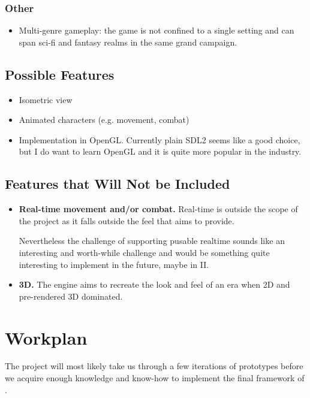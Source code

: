 \documentclass[a4paper,10pt]{book}
\begin{document}
\subsection{Other}
\begin{itemize}
  \item Multi-genre gameplay: the game is not confined to a single setting and
    can span sci-fi and fantasy realms in the same grand campaign.
\end{itemize}

\section{Possible Features}
\begin{itemize}
  \item Isometric view
  \item Animated characters (e.g. movement, combat)
  \item Implementation in OpenGL. Currently plain SDL2 seems like a good
    choice, but I do want to learn OpenGL and it is quite more popular in the
    industry.
\end{itemize}

\section{Features that Will Not be Included}
\begin{itemize}
  \item \textbf{Real-time movement and/or combat.} Real-time is outside the
    scope of the project as it falls outside the feel that \Gamename{} aims to
    provide.
 
  Nevertheless the challenge of supporting pusable realtime sounds like an
    interesting and worth-while challenge and would be something quite
    interesting to implement in the future, maybe in \Enginename{} II.
 
  \item \textbf{3D.} The engine aims to recreate the look and feel of an era
    when 2D and pre-rendered 3D dominated.
\end{itemize}

\chapter{Workplan}
The project will most likely take us through a few iterations of prototypes
before we acquire enough knowledge and know-how to implement the final
framework of \Enginename{}.
\end{document}
